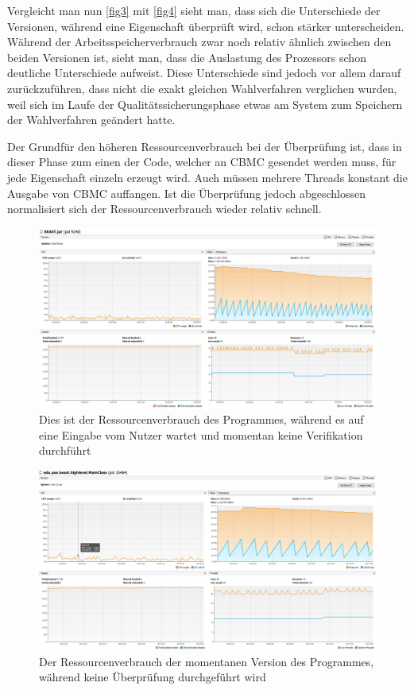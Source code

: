 \documentclass[a4paper]{scrreprt}
\begin{document}
Vergleicht man nun \ref{fig3} mit \ref{fig4} sieht man, dass sich die
Unterschiede der Versionen, während eine Eigenschaft überprüft wird, schon
stärker unterscheiden. Während der Arbeitsspeicherverbrauch zwar noch relativ
ähnlich zwischen den beiden Versionen ist, sieht man, dass die Auslastung des
Prozessors schon deutliche Unterschiede aufweist. Diese Unterschiede sind jedoch vor allem darauf
zurückzuführen, dass nicht die exakt gleichen Wahlverfahren verglichen
wurden, weil sich im Laufe der Qualitätssicherungsphase etwas am System zum
Speichern der Wahlverfahren geändert hatte.

Der Grundfür den höheren Ressourcenverbrauch bei der Überprüfung ist, dass in dieser Phase zum einen der Code, welcher an CBMC gesendet
werden muss, für jede Eigenschaft einzeln erzeugt wird. Auch müssen mehrere Threads
konstant die Ausgabe von CBMC auffangen.
Ist die Überprüfung jedoch abgeschlossen normalisiert sich der
Ressourcenverbrauch wieder relativ schnell.

\newpage
\begin{figure}[ht]
	\centering
  \includegraphics[width=1.0\textwidth,
  height=0.40\textwidth]{images/OLD_NO.png} \caption{Dies ist der
  Ressourcenverbrauch des Programmes, während es auf eine Eingabe vom Nutzer wartet und momentan keine Verifikation durchführt}
	\label{fig1}
\end{figure}

\vspace{4cm}

\begin{figure}[ht]
	\centering
  \includegraphics[width=1.0\textwidth,
  height=0.40\textwidth]{images/NEW_NO.png} \caption{Der Ressourcenverbrauch der
  momentanen Version des Programmes, während keine Überprüfung durchgeführt wird}
	\label{fig2}
\end{figure}
\end{document}
